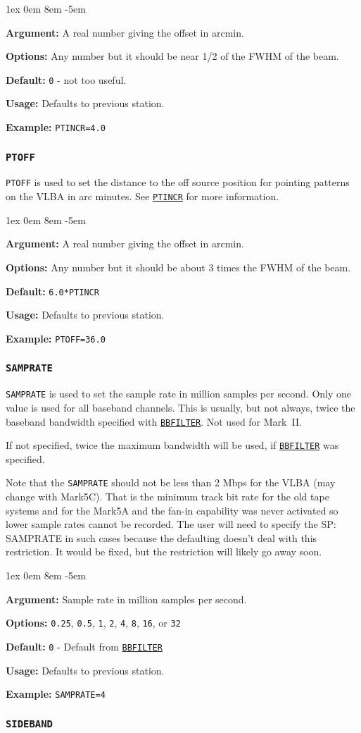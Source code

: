 \documentclass{report}
\newcommand{\rcwbox}[5]{
  \begin{list}{}{\parsep 1ex  \itemsep 0em
                 \leftmargin 8em  \itemindent -5em }
    \item {\bf Argument:} #1
    \item {\bf Options:}  #2
    \item {\bf Default:}  #3
    \item {\bf Usage:}    #4
    \item {\bf Example:}  #5
  \end{list}
}
\begin{document}
\rcwbox
{A real number giving the offset in arcmin.}
{Any number but it should be near 1/2 of the FWHM of the beam.}
{{\tt 0} - not too useful.}
{Defaults to previous station.}
{{\tt PTINCR=4.0}}



\subsubsection{\label{SP:PTOFF}{\tt PTOFF}}

{\tt PTOFF} is used to set the distance to the off source position
for pointing patterns on the
VLBA in arc minutes. See 
{\hyperref[SP:PTINCR]{{\tt PTINCR}}} for more
information.

\rcwbox
{A real number giving the offset in arcmin.}
{Any number but it should be about 3 times the FWHM of the beam.}
{{\tt 6.0*PTINCR}}
{Defaults to previous station.}
{{\tt PTOFF=36.0}}


\subsubsection{\label{SP:SAMPRATE}{\tt SAMPRATE}}

{\tt SAMPRATE} is used to set the sample rate in million samples per
second.  Only one value is used for all baseband channels. This is
usually, but not always, twice the baseband bandwidth specified with
{\hyperref[SP:BBFILTER]{{\tt BBFILTER}}}. Not used for Mark~II.

If not specified, twice the maximum bandwidth will be used, if
{\hyperref[SP:BBFILTER]{{\tt BBFILTER}}} was specified.

Note that the {\tt SAMPRATE} should not be less than 2 Mbps for the
VLBA (may change with Mark5C).  That is the minimum track bit rate for
the old tape systems and for the Mark5A and the fan-in capability was
never activated so lower sample rates cannot be recorded.  The user
will need to specify the {SP: SAMPRATE} in such cases because the
defaulting doesn't deal with this restriction.  It would be fixed, but
the restriction will likely go away soon.

\rcwbox
{Sample rate in million samples per second.}
{{\tt 0.25}, {\tt 0.5}, {\tt 1}, {\tt 2}, {\tt 4}, {\tt 8}, {\tt 16},
or {\tt 32}}
{{\tt 0} - Default from 
{\hyperref[SP:BBFILTER]{{\tt BBFILTER}}} }
{Defaults to previous station.}
{{\tt SAMPRATE=4}}


\subsubsection{\label{SP:SIDEBAND}{\tt SIDEBAND}}
\end{document}

